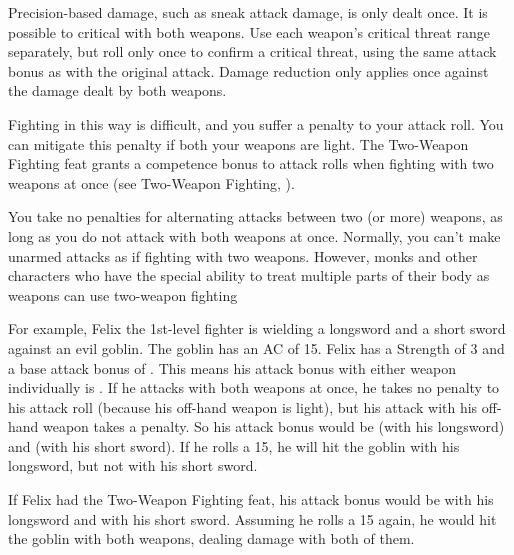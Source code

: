 \par Precision-based damage, such as sneak attack damage, is only dealt once. It is possible to critical with both weapons. Use each weapon's critical threat range separately, but roll only once to confirm a critical threat, using the same attack bonus as with the original attack. Damage reduction only applies once against the damage dealt by both weapons.

\par Fighting in this way is difficult, and you suffer a  penalty to your attack roll. You can mitigate this penalty if both your weapons are light. The Two-Weapon Fighting feat grants a  competence bonus to attack rolls when fighting with two weapons at once (see Two-Weapon Fighting, ).

You take no penalties for alternating attacks between two (or more) weapons, as long as you do not attack with both weapons at once. Normally, you can't make unarmed attacks as if fighting with two weapons. However, monks and other characters who have the special ability to treat multiple parts of their body as weapons can use two-weapon fighting

\par For example, Felix the 1st-level fighter is wielding a longsword and a short sword against an evil goblin. The goblin has an AC of 15. Felix has a Strength of 3 and a base attack bonus of . This means his attack bonus with either weapon individually is . If he attacks with both weapons at once, he takes no penalty to his attack roll (because his off-hand weapon is light), but his attack with his off-hand weapon takes a  penalty. So his attack bonus would be  (with his longsword) and  (with his short sword). If he rolls a 15, he will hit the goblin with his longsword, but not with his short sword.

\par If Felix had the Two-Weapon Fighting feat, his attack bonus would be  with his longsword and  with his short sword. Assuming he rolls a 15 again, he would hit the goblin with both weapons, dealing damage with both of them.

